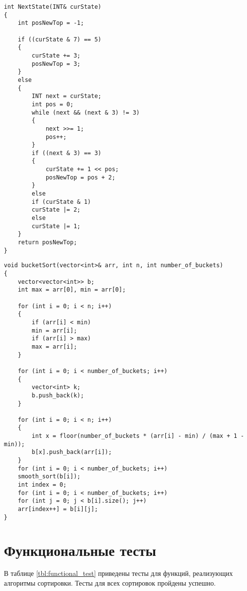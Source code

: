 \newpage
\begin{center}
\begin{lstlisting}[label=NextState, caption={Алгоритм функции NextState}]
int NextState(INT& curState)
{
	int posNewTop = -1;

	if ((curState & 7) == 5)
	{                   
		curState += 3;  
		posNewTop = 3;
	}
	else  
	{
		INT next = curState;
		int pos = 0;
		while (next && (next & 3) != 3)
		{
			next >>= 1;
			pos++;
		}
		if ((next & 3) == 3)   
		{
			curState += 1 << pos; 
			posNewTop = pos + 2;
		}
		else
		if (curState & 1)   
		curState |= 2;     
		else                    
		curState |= 1;    
	}
	return posNewTop;
}
\end{lstlisting}
\end{center}
\newpage
\begin{center}
\begin{lstlisting}[label=bucket_sort, caption={Алгоритм блочной сортировки}]
void bucketSort(vector<int>& arr, int n, int number_of_buckets)
{
	vector<vector<int>> b;
	int max = arr[0], min = arr[0];
	
	for (int i = 0; i < n; i++)
	{
		if (arr[i] < min)
		min = arr[i];
		if (arr[i] > max)
		max = arr[i];
	}
	
	for (int i = 0; i < number_of_buckets; i++)
	{
		vector<int> k;
		b.push_back(k);
	}
	
	for (int i = 0; i < n; i++)
	{
		int x = floor(number_of_buckets * (arr[i] - min) / (max + 1 - min));
		b[x].push_back(arr[i]);
	}
	for (int i = 0; i < number_of_buckets; i++)
	smooth_sort(b[i]);
	int index = 0;
	for (int i = 0; i < number_of_buckets; i++)
	for (int j = 0; j < b[i].size(); j++)
	arr[index++] = b[i][j];
}
\end{lstlisting}
\end{center}
\newpage
\section{Функциональные тесты}

В таблице \ref{tbl:functional_test} приведены тесты для функций, реализующих алгоритмы сортировки. Тесты для всех сортировок пройдены успешно.



